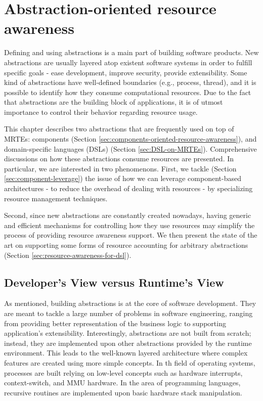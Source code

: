\chapter{Abstraction-oriented resource awareness}
\label{chap:abstractions_and_resource_management}


Defining and using abstractions is a main part of building software products.
New abstractions are usually layered atop existent software systems in order to fulfill specific goals
- ease development, improve security, provide extensibility.
Some kind of abstractions have well-defined boundaries (e.g., process, thread), and it is possible to identify how they consume computational resources.
Due to the fact that abstractions are the building block of applications, it is of utmost importance to control their behavior regarding resource usage.
  
This chapter describes two abstractions that are frequently used on top of MRTEs: components (Section \ref{sec:components-oriented-resource-awareness}), and domain-specific languages (DSLs) (Section \ref{sec:DSL-on-MRTEs}).
Comprehensive discussions on how these abstractions consume resources are presented.
In particular, we are interested in two phenomenons.
First, we tackle (Section \ref{sec:component-leverage}) the issue of how we can leverage component-based architectures - to reduce the overhead of dealing with resources - by specializing resource management techniques.

Second, since new abstractions are constantly created nowadays, having generic and efficient mechanisms for controlling how they use resources may simplify the process of providing resource awareness support.
We then present the state of the art on supporting some forms of resource accounting for arbitrary abstractions (Section \ref{sec:resource-awareness-for-dsl}).

\section{Developer's View versus Runtime's View} \label{sec:chapter2-introduction}

As mentioned, building abstractions is at the core of software development.
They are meant to tackle a large number of problems in software engineering, ranging from providing better representation of the business logic to supporting application's extensibility.
Interestingly, abstractions are not built from scratch; instead, they are implemented upon other abstractions provided by the runtime environment.
This leads to the well-known layered architecture where complex features are created using more simple concepts.
In th field of operating systems, processes are built relying on low-level concepts such as hardware interrupts, context-switch, and MMU hardware.
In the area of programming languages, recursive routines are implemented upon basic hardware stack manipulation.

